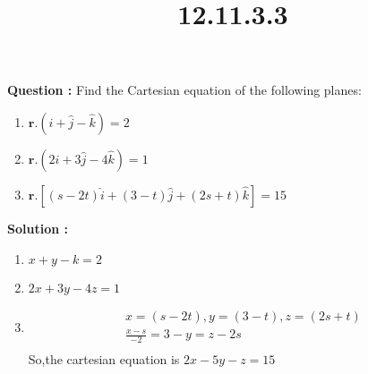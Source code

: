 \documentclass[12pt]{article}
\providecommand{\brak}[1]{\ensuremath{\left(#1\right)}}
\let\vec\mathbf
\begin{document}
\title{\textbf{12.11.3.3}}
\date{}
\maketitle
\textbf{Question :} Find the Cartesian equation of the following planes:


\begin{enumerate}
    \item $\vec{r}.\brak{\hat{i}+\hat{j}-\hat{k}}=2$
    \item $\vec{r}.\brak{2\hat{i}+3\hat{j}-4\hat{k}}=1$
    \item $\vec{r}.[\brak{s-2t}\hat{i}+\brak{3-t}\hat{j}+\brak{2s+t}\hat{k}]=15$
\end{enumerate}


\textbf{Solution :}
\begin{enumerate}
    \item $x+y-k=2$
    \item $2x+3y-4z=1$
    \item\begin{align}x=\brak{s-2t},y=\brak{3-t},z=\brak{2s+t}\\
\frac{x-s}{-2}=3-y=z-2s\\
\end{align}
So,the cartesian equation is
$2x-5y-z=15$
\end{enumerate}
\end{document}
